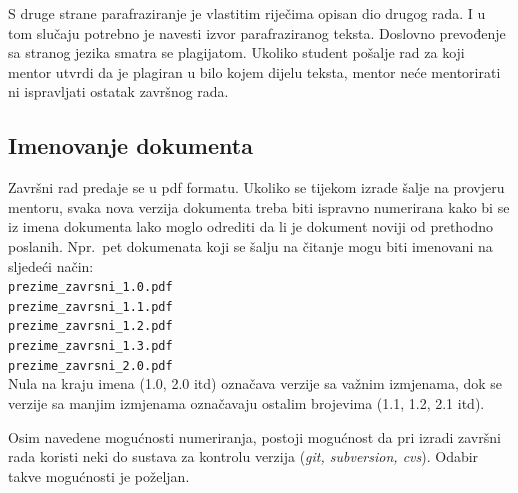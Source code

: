 S druge strane parafraziranje je vlastitim riječima opisan dio drugog rada. 
I u tom slučaju potrebno je navesti izvor 
parafraziranog teksta. Doslovno prevođenje sa stranog jezika smatra se plagijatom. Ukoliko student pošalje rad za koji mentor utvrdi da je plagiran u bilo kojem dijelu teksta, mentor neće mentorirati ni ispravljati ostatak završnog rada. 

\subsection{Imenovanje dokumenta}

Završni rad predaje se u pdf formatu. Ukoliko se tijekom izrade šalje na provjeru mentoru, svaka nova verzija dokumenta treba biti 
ispravno numerirana kako bi se iz imena 
dokumenta lako moglo odrediti da li je dokument noviji od prethodno poslanih. Npr.~pet dokumenata koji se šalju na čitanje mogu biti 
imenovani na sljedeći način:
\\
\texttt{prezime\_zavrsni\_1.0.pdf}\\
\texttt{prezime\_zavrsni\_1.1.pdf}\\
\texttt{prezime\_zavrsni\_1.2.pdf}\\
\texttt{prezime\_zavrsni\_1.3.pdf}\\
\texttt{prezime\_zavrsni\_2.0.pdf}\\
Nula na kraju imena (1.0, 2.0 itd) označava verzije sa važnim izmjenama, dok se verzije sa manjim izmjenama označavaju ostalim brojevima (1.1, 1.2, 2.1 itd). 

Osim navedene mogućnosti numeriranja, postoji mogućnost da pri izradi završni rada koristi neki do sustava za kontrolu verzija (\textit{git, subversion, cvs}). Odabir takve mogućnosti je poželjan.

